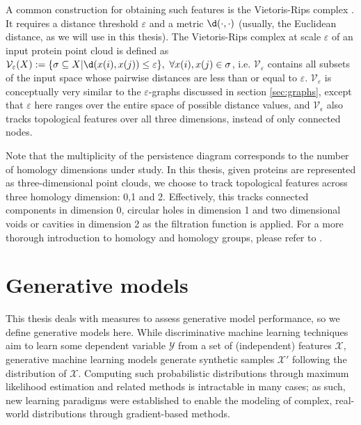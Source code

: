 A common construction for obtaining such features is the Vietoris-Rips complex
\citep{vietoris1927hoheren}. It requires a distance threshold $\varepsilon$ and
a metric $\d( \cdot, \cdot)$ (usually, the Euclidean distance, as we will
use in this thesis). The Vietoris-Rips complex at scale $\varepsilon$ of an
input protein point cloud is defined as
$\mathcal{V}_{\varepsilon}(X):=\{\sigma\subseteq X| \d(x(i),
x(j))\leq\varepsilon\},\ \forall x(i),x(j)\in\sigma$, i.e.
$\mathcal{V}_{\varepsilon}$ contains all subsets of the input space whose
pairwise distances are less than or equal to $\varepsilon$.
$\mathcal{V}_{\varepsilon}$ is conceptually very similar to the
$\varepsilon$-graphs discussed in section \ref{sec:graphs}, except that
$\varepsilon$ here ranges over the entire space of possible distance values, and
$\mathcal{V}_{\epsilon}$ also tracks topological features over all three
dimensions, instead of only connected nodes.

Note that the multiplicity of the persistence diagram corresponds to the number
of homology dimensions under study. In this thesis, given proteins are
represented as three-dimensional point clouds, we choose to track topological
features across three homology dimension: 0,1 and 2. Effectively, this tracks
connected components in dimension 0, circular holes in dimension 1 and two
dimensional voids or cavities in dimension 2 as the filtration function is
applied. For a more thorough introduction to homology and homology groups,
please refer to \cite{edelsbrunner2010computational}.

\section{Generative models}\label{genmodels}

This thesis deals with measures to assess generative model performance, so we
define generative models here. While discriminative machine learning techniques
aim to learn some dependent variable $\mathcal{Y}$ from a set of (independent)
features $\mathcal{X}$, generative machine learning models generate synthetic
samples $\mathcal{X}'$ following the distribution of $\mathcal{X}$. Computing
such probabilistic distributions through maximum likelihood estimation and
related methods is intractable in many cases; as such, new learning paradigms
were established to enable the modeling of complex, real-world distributions
through gradient-based methods.

